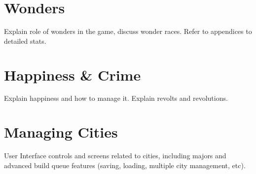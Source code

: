 \section{Wonders}
Explain role of wonders in the game, discuss wonder races. Refer to appendices
to detailed stats.

\section{Happiness \& Crime}
Explain happiness and how to manage it. Explain revolts and revolutions.

\section{Managing Cities}
User Interface controls and screens related to cities, including majors and
advanced build queue features (saving, loading, multiple city management, etc).


